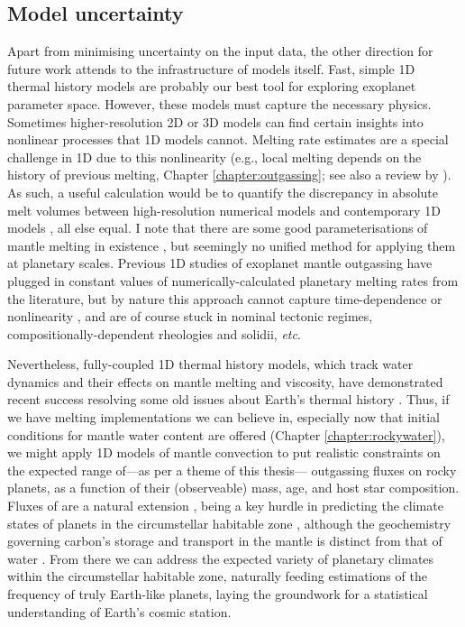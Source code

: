 
\subsection{Model uncertainty}


Apart from minimising uncertainty on the input data, the other direction for future work attends to the infrastructure of models itself. Fast, simple 1D thermal history models are probably our best tool for exploring exoplanet parameter space. However, these models must capture the necessary physics. Sometimes higher-resolution 2D or 3D models can find certain insights into nonlinear processes that 1D models cannot. Melting rate estimates are a special challenge in 1D due to this nonlinearity (e.g., local melting depends on the history of previous melting, Chapter \ref{chapter:outgassing}; see also a review by \citealt{katz_physics_2022}). As such, a useful calculation would be to quantify the discrepancy in absolute melt volumes between high-resolution numerical models \citep[e.g.,][]{noack_volcanism_2017} and contemporary 1D models \citep[e.g.,][]{spaargaren_influence_2020, baumeister_redox_2023}, all else equal. I note that there are some good parameterisations of mantle melting in existence \citep[e.g.,][]{katz_new_2003}, but seemingly no unified method for applying them at planetary scales. Previous 1D studies of exoplanet mantle outgassing \citep[e.g.,][]{liggins_growth_2022} have plugged in constant values of numerically-calculated planetary melting rates from the literature, but by nature this approach cannot capture time-dependence or nonlinearity \citep[cf.][]{keller_statistical_2012}, and are of course stuck in nominal tectonic regimes, compositionally-dependent rheologies and solidii, \textit{etc}. 

Nevertheless, fully-coupled 1D thermal history models, which track water dynamics and their effects on mantle melting and viscosity, have demonstrated recent success resolving some old issues about Earth's thermal history \citep{seales_buffering_2022}. Thus, if we have melting implementations we can believe in, especially now that initial conditions for mantle water content are offered (Chapter \ref{chapter:rockywater}), we might apply 1D models of mantle convection to put realistic constraints on the expected range of---as per a theme of this thesis--- outgassing fluxes on rocky planets, as a function of their (observeable) mass, age, and host star composition. Fluxes of  are a natural extension \citep[see][]{lehmer_carbonatesilicate_2020}, being a key hurdle in predicting the climate states of planets in the circumstellar habitable zone \citep[e.g.,][]{graham_co2_2022}, although the geochemistry governing carbon's storage and transport in the mantle is distinct from that of water \citep{dasgupta_ingassing_2013}. From there we can address the expected variety of planetary climates within the circumstellar habitable zone, naturally feeding estimations of the frequency of truly Earth-like planets, laying the groundwork for a statistical understanding of Earth’s cosmic station.




